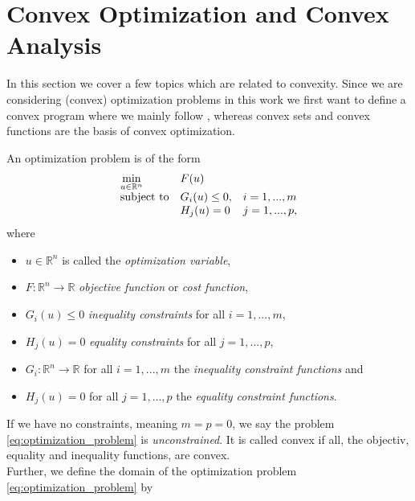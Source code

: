 \section{Convex Optimization and Convex Analysis} %
\label{sec:convex_optimization_and_convex_analysis}

    In this section we cover a few topics which are related to convexity. Since we are considering (convex) optimization problems in this work we first want to define a convex program where we mainly follow \cite{Boyd}, whereas convex sets and convex functions are the basis of convex optimization.

    An optimization problem is of the form
        \begin{equation}
            \begin{array}{l l l}
                \min\limits_{u \in \mathbb{R}^{n}} & F(u) & \\
                \textnormal{subject to} & G_{i}(u) \le 0, & i = 1, ..., m \\
                & H_{j}(u) = 0 & j = 1, ..., p,
            \end{array}
            \label{eq:optimization_problem}
        \end{equation}
    where
        \begin{itemize}
            \item $u \in \mathbb{R}^{n}$ is called the \textit{optimization variable},
            \item $F: \mathbb{R}^{n} \longrightarrow \mathbb{R}$ \textit{objective function} or \textit{cost function},
            \item $G_{i}(u) \le 0$ \textit{inequality constraints} for all $i = 1, ..., m$,
            \item $H_{j}(u) = 0$ \textit{equality constraints} for all $j = 1, ..., p$,
            \item $G_{i}: \mathbb{R}^{n} \longrightarrow \mathbb{R}$ for all $i = 1, ..., m$ the \textit{inequality constraint functions} and
            \item $H_{j}(u) = 0$ for all $j = 1, ..., p$ the \textit{equality constraint functions}.
        \end{itemize}
    If we have no constraints, meaning $m = p = 0$, we say the problem \ref{eq:optimization_problem} is \textit{unconstrained}. It is called convex if all, the objectiv, equality and inequality functions, are convex.\\
    Further, we define the domain of the optimization problem \ref{eq:optimization_problem} by
